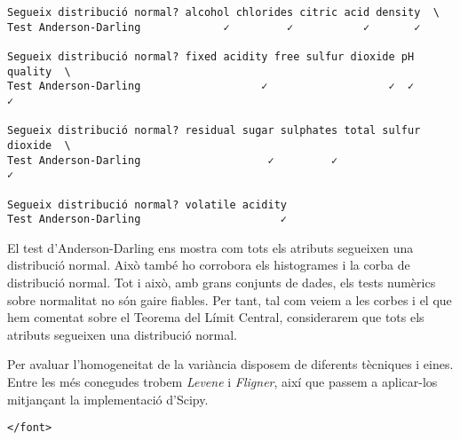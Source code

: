 \documentclass[11pt]{article}
\begin{document}
    
    \begin{verbatim}
Segueix distribució normal? alcohol chlorides citric acid density  \
Test Anderson-Darling             ✓         ✓           ✓       ✓   

Segueix distribució normal? fixed acidity free sulfur dioxide pH quality  \
Test Anderson-Darling                   ✓                   ✓  ✓       ✓   

Segueix distribució normal? residual sugar sulphates total sulfur dioxide  \
Test Anderson-Darling                    ✓         ✓                    ✓   

Segueix distribució normal? volatile acidity  
Test Anderson-Darling                      ✓  
    \end{verbatim}

    
    El test d'Anderson-Darling ens mostra com tots els atributs segueixen
una distribució normal. Això també ho corrobora els histogrames i la
corba de distribució normal. Tot i això, amb grans conjunts de dades,
els tests numèrics sobre normalitat no són gaire fiables. Per tant, tal
com veiem a les corbes i el que hem comentat sobre el Teorema del Límit
Central, considerarem que tots els atributs segueixen una distribució
normal.

Per avaluar l'homogeneitat de la variància disposem de diferents
tècniques i eines. Entre les més conegudes trobem \emph{Levene} i
\emph{Fligner}, així que passem a aplicar-los mitjançant la
implementació d'Scipy.

\begin{verbatim}
</font>
\end{verbatim}
\end{document}
